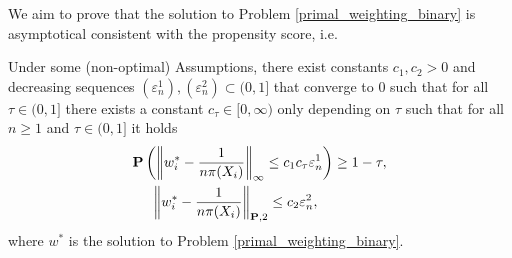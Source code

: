 We aim to prove that the solution to 
Problem \eqref{primal_weighting_binary}
is asymptotical consistent with the propensity score, i.e.

\begin{theorem}
  \label{ch_theorem_1}
  Under some (non-optimal) Assumptions,
  there exist constants
  $
    c_{1}
    , 
    c_{2}
    >
    0
  $
  and decreasing sequences
  $
    (\varepsilon_n^1)
    ,
    (\varepsilon_n^2)
    \subset
    (0,1]
  $
  that converge to 0
  such that
  for all
  $
    \tau
    \in
    (0,1]
  $
  there exists a constant
  $
    c_{\tau}
    \in
    [0,\infty)
  $
  only depending on 
  $ \tau $
  such that for all 
  $ n \ge 1 $
  and
  $
    \tau
    \in
    (0,1]
  $
  it holds
  \begin{align}
    \label{ch_theorem_1_alternative}
    \begin{split}
   & \mathbf{P}
    \left( 
  \left\lVert
    w^*_i
    -
    \frac{1}{n \pi(X_i)}
  \right\rVert_\infty
  \le 
  c_{1}
  c_{\tau}
  \varepsilon_{n}^1 
   \right)
   \ge
  1 - \tau
  ,
\\
   &\quad \
   \left\lVert
    w^*_i
    -
    \frac{1}{n \pi(X_i)}
  \right\rVert_{\mathbf{P}, 2}
  \le 
  c_{2}
  \varepsilon_n^{2},
      \end{split}
  \end{align}
  where 
  $w^*$
  is the solution to 
  Problem \eqref{primal_weighting_binary}.
\end{theorem}





